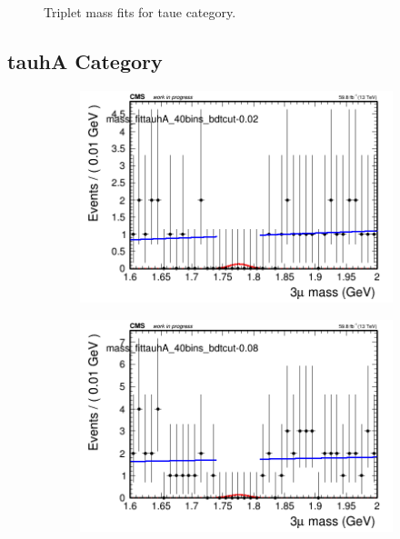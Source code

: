 \begin{figure}[H]
\begin{subfigure}{0.2\textwidth}
        \caption{}
    \end{subfigure}
    \caption{Triplet mass fits for taue category.}
    \label{fig:powerlawtaue}
\end{figure}

\subsection{tauhA Category}
\label{sec:powerlawtauhA}

\begin{figure}[H]
    \centering
    \begin{subfigure}{0.2\textwidth}
        \includegraphics[width=\textwidth]{power_law/plots/tauhA/massfit_tauhA_40bins_bdtcut-0.02.png}
        \caption{}
    \end{subfigure}
    \begin{subfigure}{0.2\textwidth}
        \includegraphics[width=\textwidth]{power_law/plots/tauhA/massfit_tauhA_40bins_bdtcut-0.08.png}

\end{subfigure}
\end{figure}
